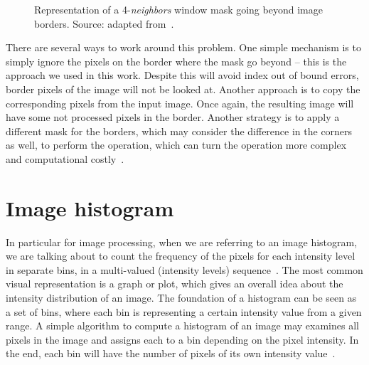 \begin{figure}[ht]
    \centering

    \caption[Representation of a 4-\textit{neighbors} window mask going beyond image borders]{Representation of a 4-\textit{neighbors} window mask going beyond image borders. Source: adapted from~\citet{pedrini:08}.}
    \label{fig:img_boundaries}
\end{figure}

There are several ways to work around this problem. One simple mechanism is to simply ignore the pixels on the border where the mask go beyond -- this is the approach we used in this work. Despite this will avoid index out of bound errors, border pixels of the image will not be looked at. Another approach is to copy the corresponding pixels from the input image. Once again, the resulting image will have some not processed pixels in the border. Another strategy is to apply a different mask for the borders, which may consider the difference in the corners as well, to perform the operation, which can turn the operation more complex and computational costly~\citep{pedrini:08}.


\section{Image histogram}
\label{sec:image_histogram}
In particular for image processing, when we are referring to an image histogram, we are talking about to count the frequency of the pixels for each intensity level in separate bins, in a multi-valued (intensity levels) sequence~\citep{fisher:03}. The most common visual representation is a graph or plot, which gives an overall idea about the intensity distribution of an image. The foundation of a histogram can be seen as a set of bins, where each bin is representing a certain intensity value from a given range. A simple algorithm to compute a histogram of an image may examines all pixels in the image and assigns each to a bin depending on the pixel intensity. In the end, each bin will have the number of pixels of its own intensity value~\citep{gonzalez:02}.

